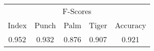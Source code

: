 \documentclass{standalone}
\begin{document}
 
 \begin{tabular}{|c|c|c|c ||c|}
\cline{1-5}\multicolumn{5}{|c|}{F-Scores} \\ 
\cline{1-5}Index & Punch & Palm & Tiger & Accuracy\\ 
\cline{1-5}0.952 & 0.932 & 0.876 & 0.907 & 0.921\\ 
 \cline{1-5}\hline \end{tabular}
 
\end{document}
